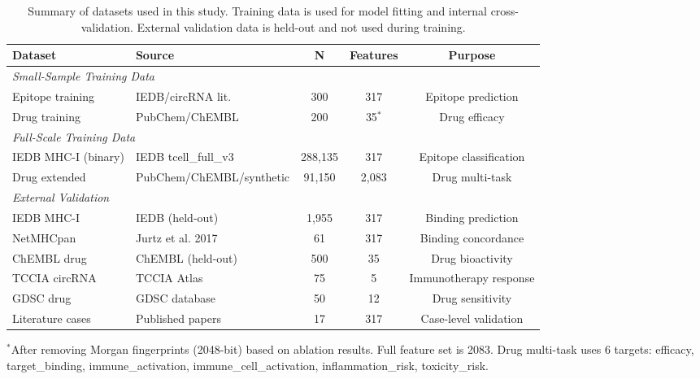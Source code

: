 \begin{table}[htbp]
\centering
\caption{Summary of datasets used in this study. Training data is used for model fitting and internal cross-validation. External validation data is held-out and not used during training.}
\label{tab:dataset}
\begin{tabular}{llccc}
\toprule
Dataset & Source & N & Features & Purpose \\
\midrule
\multicolumn{5}{l}{\textit{Small-Sample Training Data}} \\
Epitope training & IEDB/circRNA lit. & 300 & 317 & Epitope prediction \\
Drug training & PubChem/ChEMBL & 200 & 35$^*$ & Drug efficacy \\
\midrule
\multicolumn{5}{l}{\textit{Full-Scale Training Data}} \\
IEDB MHC-I (binary) & IEDB tcell\_full\_v3 & 288,135 & 317 & Epitope classification \\
Drug extended & PubChem/ChEMBL/synthetic & 91,150 & 2,083 & Drug multi-task \\
\midrule
\multicolumn{5}{l}{\textit{External Validation}} \\
IEDB MHC-I & IEDB (held-out) & 1,955 & 317 & Binding prediction \\
NetMHCpan & Jurtz et al. 2017 & 61 & 317 & Binding concordance \\
ChEMBL drug & ChEMBL (held-out) & 500 & 35 & Drug bioactivity \\
TCCIA circRNA & TCCIA Atlas & 75 & 5 & Immunotherapy response \\
GDSC drug & GDSC database & 50 & 12 & Drug sensitivity \\
Literature cases & Published papers & 17 & 317 & Case-level validation \\
\bottomrule
\end{tabular}
\footnotesize {$^*$After removing Morgan fingerprints (2048-bit) based on ablation results. Full feature set is 2083. Drug multi-task uses 6 targets: efficacy, target\_binding, immune\_activation, immune\_cell\_activation, inflammation\_risk, toxicity\_risk.}
\end{table}
